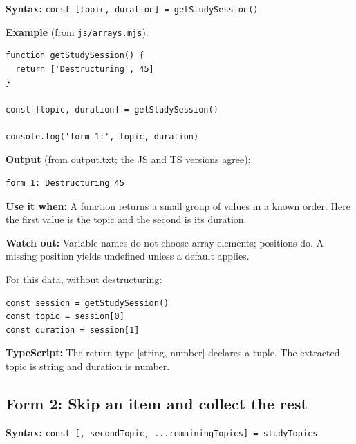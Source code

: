 \documentclass[10pt,a4paper]{article}
\begin{document}
\textbf{Syntax:} \texttt{const [topic,\allowbreak{} duration] =\allowbreak{} get\allowbreak{}Study\allowbreak{}Session()}


\textbf{Example} (from \texttt{js/\allowbreak{}arrays.\allowbreak{}mjs}):

\begin{lstlisting}[language=GuideJS]
function getStudySession() {
  return ['Destructuring', 45]
}

const [topic, duration] = getStudySession()

console.log('form 1:', topic, duration)
\end{lstlisting}


\textbf{Output} (from output.txt; the JS and TS versions agree):

\begin{lstlisting}[language={}]
form 1: Destructuring 45
\end{lstlisting}

\textbf{Use it when:} A function returns a small group of values in a known order. Here the first value is the topic and the second is its duration.

\textbf{Watch out:} Variable names do not choose array elements; positions do. A missing position yields undefined unless a default applies.


For this data, without destructuring:

\begin{lstlisting}[language=GuideJS]
const session = getStudySession()
const topic = session[0]
const duration = session[1]
\end{lstlisting}

\textbf{TypeScript:} The return type [string, number] declares a tuple. The extracted topic is string and duration is number.

\subsection{Form 2: Skip an item and collect the rest}

\textbf{Syntax:} \texttt{const [,\allowbreak{} second\allowbreak{}Topic,\allowbreak{} .\allowbreak{}.\allowbreak{}.\allowbreak{}remaining\allowbreak{}Topics] =\allowbreak{} study\allowbreak{}Topics}
\end{document}
